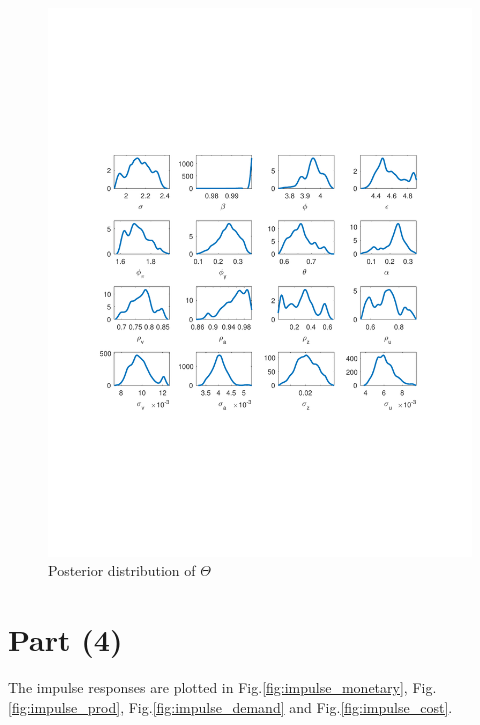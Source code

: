\documentclass[12pt]{article}
\theoremstyle{definition}
\begin{document}
\begin{figure}[H]
	\centering
	\includegraphics[width=\linewidth]{dist_MCMC}
	\caption{Posterior distribution of $\Theta$}
	\label{fig:dist}
\end{figure}


\section*{Part (4)}

The impulse responses are plotted in Fig.\ref{fig:impulse_monetary}, Fig.\ref{fig:impulse_prod}, Fig.\ref{fig:impulse_demand} and Fig.\ref{fig:impulse_cost}.
\end{document}
